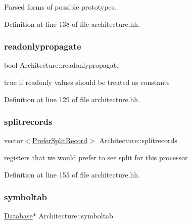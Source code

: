 Parsed forms of possible prototypes. 



Definition at line 138 of file architecture.\+hh.

\mbox{\label{class_architecture_a64c49555bfdee44b82f3a9a98005ed0d}} 
\subsubsection{\texorpdfstring{readonlypropagate}{readonlypropagate}}
{\footnotesize\ttfamily bool Architecture\+::readonlypropagate}



true if readonly values should be treated as constants 



Definition at line 129 of file architecture.\+hh.

\mbox{\label{class_architecture_a2ed25d7790e67e8bfaef34c092e5f39b}} 
\subsubsection{\texorpdfstring{splitrecords}{splitrecords}}
{\footnotesize\ttfamily vector$<$\mbox{\hyperlink{struct_prefer_split_record}{Prefer\+Split\+Record}}$>$ Architecture\+::splitrecords}



registers that we would prefer to see split for this processor 



Definition at line 155 of file architecture.\+hh.

\mbox{\label{class_architecture_ab426c9baa9013d9826041a4083e844ef}} 
\subsubsection{\texorpdfstring{symboltab}{symboltab}}
{\footnotesize\ttfamily \mbox{\hyperlink{class_database}{Database}}$\ast$ Architecture\+::symboltab}



